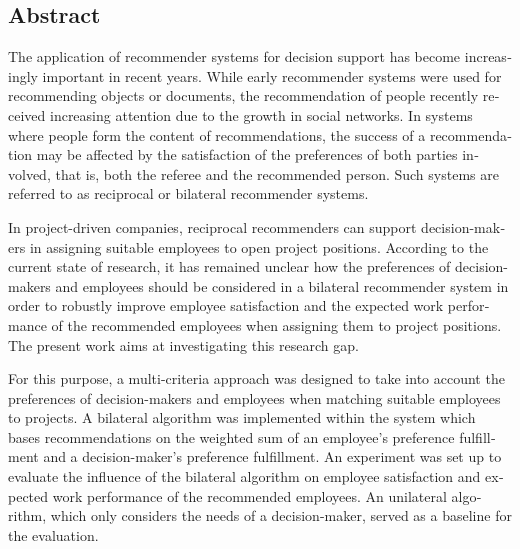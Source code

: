 
\begin{otherlanguage}{american}
	\chapter*{Abstract}
	

	The application of recommender systems for decision support has become increasingly important in recent years.
	While early recommender systems were used for recommending objects or documents, the recommendation of people recently received increasing attention due to the growth in social networks.
	In systems where people form the content of recommendations, the success of a recommendation may be affected by the satisfaction of the preferences of both parties involved, that is, both the referee and the recommended person.
	Such systems are referred to as reciprocal or bilateral recommender systems.
	
	In project-driven companies, reciprocal recommenders can support decision-makers in assigning suitable employees to open project positions.
	According to the current state of research, it has remained unclear how the preferences of decision-makers and employees should be considered in a bilateral recommender system in order to robustly improve employee satisfaction and the expected work performance of the recommended employees when assigning them to project positions.
	The present work aims at investigating this research gap.
	
	For this purpose, a multi-criteria approach was designed to take into account the preferences of decision-makers and employees when matching suitable employees to projects.
	A bilateral algorithm was implemented within the system which bases recommendations on the weighted sum of an employee's preference fulfillment and a decision-maker's preference fulfillment.
	An experiment was set up to evaluate the influence of the bilateral algorithm on employee satisfaction and expected work performance of the recommended employees.
	An unilateral algorithm, which only considers the needs of a decision-maker, served as a baseline for the evaluation.
	

\end{otherlanguage}
